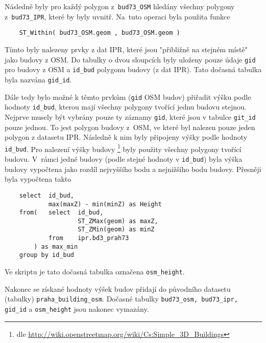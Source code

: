 Následně byly pro každý polygon z~{\tt bud73\_OSM} hledány
všechny polygony z~{\tt bud73\_IPR}, které by byly uvnitř.
Na~tuto operaci byla použita funkce
\begin{verbatim}
    ST_Within( bud73_OSM.geom , bud73_OSM.geom )
\end{verbatim}
Tímto byly nalezeny prvky z dat IPR, které jsou "přibližně na stejném
místě" jako budovy z OSM. Do tabulky o dvou sloupcích byly uloženy
pouze údaje {\tt gid} pro budovy z OSM a {\tt id\_bud} polygonu budovy
(z dat IPR). Tato dočasná tabulka byla nazvána {\tt gid\_id}.

Dále tedy bylo možné k těmto prvkům ({\tt gid} OSM budov) přiřadit
výšku podle hodnoty {\tt id\_bud}, kterou mají všechny polygony
tvořící jednu budovu stejnou. Nejprve musely být vybrány pouze ty
záznamy {\tt gid}, které jsou v tabulce {\tt git\_id} pouze jednou.
To jest polygon budovy z~OSM, ve které byl nalezen pouze jeden polygon
z datasetu IPR. Následně k nim byly připojeny výšky podle hodnoty
{\tt id\_bud}. Pro nalezení výšky budovy \footnote{dle \url{http://wiki.openstreetmap.org/wiki/Cs:Simple_3D_Buildings}}
byly použity všechny polygony tvořící budovu. V~rámci jedné budovy
(podle stejné hodnoty v {\tt id\_bud}) byla výška budovy vypočtena
jako rozdíl nejvyššího bodu a nejnižšího bodu budovy.
Přesněji byla vypočtena takto
\begin{verbatim}
    select	id_bud,
            max(maxZ) - min(minZ) as Height
    from(   select	id_bud,
                    ST_ZMax(geom) as maxZ,
                    ST_ZMin(geom) as minZ
            from    ipr.bd3_prah73
        ) as max_min
    group by id_bud
\end{verbatim}
Ve skriptu je tato dočasná tabulka označena {\tt osm\_height}.

Nakonec se získané hodnoty výšek budov přidají do původního datasetu
(tabulky) {\tt praha\_building\_osm}. 
Dočasné tabulky {\tt bud73\_osm, bud73\_ipr, gid\_id} a
{\tt osm\_height} jsou nakonec vymazány.






